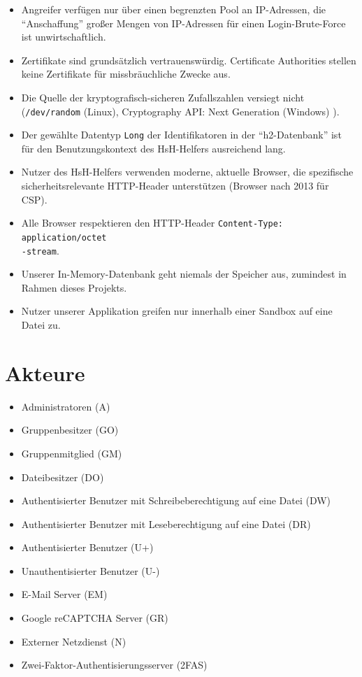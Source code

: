 \documentclass[fontsize=12pt,DIV=14,BCOR=10mm,a4paper,parskip=half-,headsepline,headinclude,english,ngerman,bibliography=totocnumbered]{scrreprt}
\begin{document}
\begin{itemize}
  \item Angreifer verfügen nur über einen begrenzten Pool an IP-Adressen, die \enquote{Anschaffung} großer Mengen von IP-Adressen für einen Login-Brute-Force ist unwirtschaftlich.
  \item Zertifikate sind grundsätzlich vertrauenswürdig. Certificate Authorities stellen keine Zertifikate für missbräuchliche Zwecke aus.
  \item Die Quelle der kryptografisch-sicheren Zufallszahlen versiegt nicht (\texttt{/dev/random} (Linux), Cryptography API: Next Generation (Windows) \autocite{Windows.SecureRandom}).
  \item Der gewählte Datentyp \texttt{Long} der Identifikatoren in der \enquote{h2-Datenbank} ist für den Benutzungskontext des HsH-Helfers ausreichend lang.
  \item Nutzer des HsH-Helfers verwenden moderne, aktuelle Browser, die spezifische sicherheitsrelevante HTTP-Header unterstützen (Browser nach 2013 für CSP).
  \item Alle Browser respektieren den HTTP-Header \texttt{Content-Type: application/octet\\-stream}.
  \item Unserer In-Memory-Datenbank geht niemals der Speicher aus, zumindest in Rahmen dieses Projekts.
  \item Nutzer unserer Applikation greifen nur innerhalb einer Sandbox auf eine Datei zu.
\end{itemize}

\renewcommand*{\chapterheadstartvskip}{\vspace*{\topskip}}

\chapter{Akteure}

\begin{itemize}
  \item Administratoren (A)
  \item Gruppenbesitzer (GO)
  \item Gruppenmitglied (GM)
  \item Dateibesitzer (DO)
  \item Authentisierter Benutzer mit Schreibeberechtigung auf eine Datei (DW)
  \item Authentisierter Benutzer mit Leseberechtigung auf eine Datei (DR)
  \item Authentisierter Benutzer (U+)
  \item Unauthentisierter Benutzer (U-)
  \item E-Mail Server (EM)
  \item Google reCAPTCHA Server (GR)
  \item Externer Netzdienst (N)
  \item Zwei-Faktor-Authentisierungsserver (2FAS)
\end{itemize}
\end{document}
